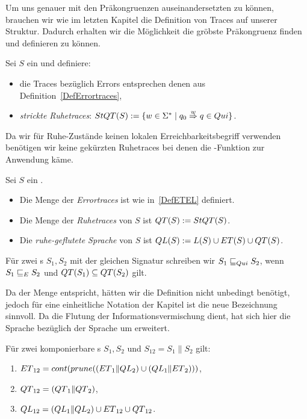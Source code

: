 Um uns genauer mit den Präkongruenzen auseinandersetzten zu können, brauchen
wir wie im letzten Kapitel die Definition von Traces auf unserer Struktur.
Dadurch erhalten wir die Möglichkeit die gröbste Präkongruenz finden und
definieren zu können.

\begin{Def}
  \label{DefRuhetraces}
  Sei $S$ ein \EIO{} und definiere:
  \begin{itemize}
    \item die Traces bezüglich Errors entsprechen denen
      aus Definition~\ref{DefErrortraces},
    \item \emph{strickte Ruhetraces}: $StQT{}(S) := \{w\in\Sigma ^*\mid q_0
      \overset{w}{\Rightarrow} q\in Qui\}$.
  \end{itemize}
\end{Def}

Da wir für Ruhe-Zustände keinen lokalen Erreichbarkeitsbegriff verwenden benötigen
wir keine gekürzten Ruhetraces bei denen die \prune{}-Funktion zur
Anwendung käme.

\begin{Def}
  \label{DefQTQL}
  Sei $S$ ein \EIO{}.
  \begin{itemize}
    \item Die Menge der \emph{Errortraces} ist wie in~\ref{DefETEL} definiert.
    \item Die Menge der \emph{Ruhetraces} von $S$ ist $QT{}(S) :=
      StQT{}(S)$.
    \item Die \emph{ruhe-geflutete Sprache} von $S$ ist
      $QL{}(S):=L(S)\cup ET{}(S)\cup QT{}(S)$.
  \end{itemize}
  Für zwei \EIO{}s $S_1, S_2$ mit der gleichen Signatur schreiben wir
  $S_1\sqsubseteq _{Qui} S_2$, wenn $S_1\sqsubseteq _E S_2$ und $QT{}(S_1)\subseteq QT{}(S_2)$ gilt.
\end{Def}

Da \QT{} der Menge \StQT{} entspricht, hätten wir die Definition nicht
unbedingt benötigt, jedoch für eine einheitliche Notation der Kapitel ist die
neue Bezeichnung sinnvoll. Da die Flutung der Informationsvermischung dient,
hat sich hier die Sprache \QL{} bezüglich der Sprache \EL{} um \QT{} erweitert.\\

\begin{satz}
  \label{satzQuiSemantik}
  Für zwei komponierbare \EIO{}s $S_1, S_2$ und $S_{12} = S_1\|S_2$ gilt:
  \begin{enumerate}
    \item $ET{}_{12} = cont{}(prune{}((ET{}_1\|QL{}_2)\cup (QL{}_1\|ET{}_2)))$,
    \item $QT{}_{12} = (QT{}_1\|QT{}_2)$,
    \item $QL{}_{12} = (QL{}_1\|QL{}_2)\cup ET{}_{12}\cup QT{}_{12}$.
  \end{enumerate}
\end{satz}

